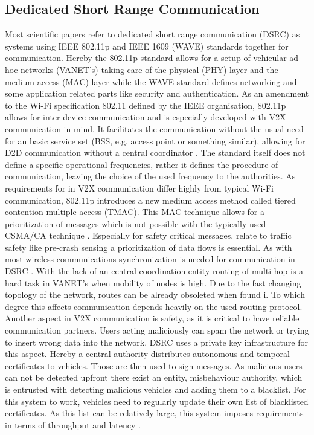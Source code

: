 \documentclass[conference,12pt,onecolumn]{IEEEtran}
\begin{document}
\subsection{Dedicated Short Range Communication}
Most scientific papers refer to dedicated short range communication (DSRC) as systems using IEEE 802.11p and  IEEE 1609 (WAVE) standards together for communication\cite{machardy2018}. Hereby the 802.11p standard allows for a setup of vehicular ad-hoc networks (VANET's) taking care of the physical (PHY) layer and the medium access (MAC) layer while the WAVE standard defines networking and some application related parts like security and authentication.
As an amendment to the Wi-Fi specification 802.11 defined by the IEEE organisation, 802.11p allows for inter device communication and is especially developed with V2X communication in mind. It facilitates the communication without the usual need for an basic service set (BSS, e.g. access point or something similar), allowing for D2D communication without a central coordinator \cite{machardy2018}. The standard itself does not define a specific operational frequencies, rather it defines the procedure of communication, leaving the choice of the used frequency to the authorities. As requirements for in V2X communication differ highly from typical Wi-Fi communication, 802.11p introduces a new medium access method called tiered contention multiple access (TMAC). This MAC technique allows for a prioritization of messages which is not possible with the typically used CSMA/CA technique \cite{machardy2018}. Especially for safety critical messages, relate to traffic safety like pre-crash sensing a prioritization of data flows is essential.
As with most wireless communications synchronization is needed for communication in DSRC \cite{kenney2011}. With the lack of an central coordination entity routing of multi-hop is a hard task in VANET's when mobility of nodes is high. Due to the fast changing topology of the network, routes can be already obsoleted when found i\cite{machardy2018}. To which degree this affects communication depends heavily on the used routing protocol.
Another aspect in V2X communication is safety, as it is critical to have reliable communication partners. Users acting maliciously can spam the network or trying to insert wrong data into the network. DSRC uses a private key infrastructure for this aspect. Hereby a central authority distributes autonomous and temporal certificates to vehicles. Those are then used to sign messages. As malicious users can not be detected upfront there exist an entity, misbehaviour authority, which is entrusted with detecting malicious vehicles and adding them to a blacklist. For this system to work, vehicles need to regularly update their own list of blacklisted certificates. As this list can be relatively large, this system imposes requirements in terms of throughput and latency \cite{machardy2018}.
\end{document}
